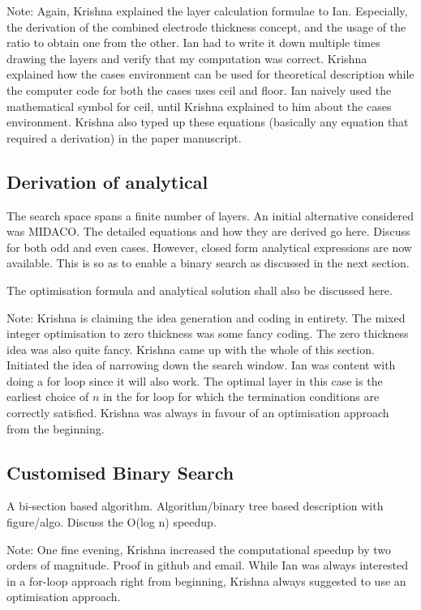 Note:  Again,  Krishna   explained  the  layer  calculation   formulae  to  Ian.
Especially, the derivation of the  combined electrode thickness concept, and the
usage of  the ratio  to obtain  one from  the other.  Ian had  to write  it down
multiple times  drawing the layers and  verify that my computation  was correct.
Krishna  explained  how  the  cases  environment can  be  used  for  theoretical
description while the computer code for both  the cases uses ceil and floor. Ian
naively used  the mathematical symbol for  ceil, until Krishna explained  to him
about the  cases environment. Krishna  also typed up these  equations (basically
any equation that required a derivation) in the paper manuscript.

\subsection{Derivation of analytical }

The  search space  spans  a  finite number  of  layers.  An initial  alternative
considered was MIDACO. The detailed equations  and how they are derived go here.
Discuss for both odd and even cases. However, closed form analytical expressions
are now available. This  is so as to enable a binary search  as discussed in the
next section.

The optimisation formula and analytical solution shall also be discussed here.

Note: Krishna is claiming the idea  generation and coding in entirety. The mixed
integer optimisation to zero thickness was some fancy coding. The zero thickness
idea was  also quite  fancy. Krishna  came up  with the  whole of  this section.
Initiated the  idea of narrowing  down the search  window. Ian was  content with
doing a for loop since it will also  work. The optimal layer in this case is the
earliest choice of $n$ in the for  loop for which the termination conditions are
correctly satisfied.  Krishna was always  in favour of an  optimisation approach
from the beginning.

\subsection{Customised Binary Search}

A  bi-section  based algorithm.  Algorithm/binary  tree  based description  with
figure/algo. Discuss the O(log n) speedup.

Note: One fine evening, Krishna increased the computational speedup by two orders of magnitude. Proof in github and email. While Ian was always interested in a for-loop approach right from beginning, Krishna always suggested to use an optimisation approach.

